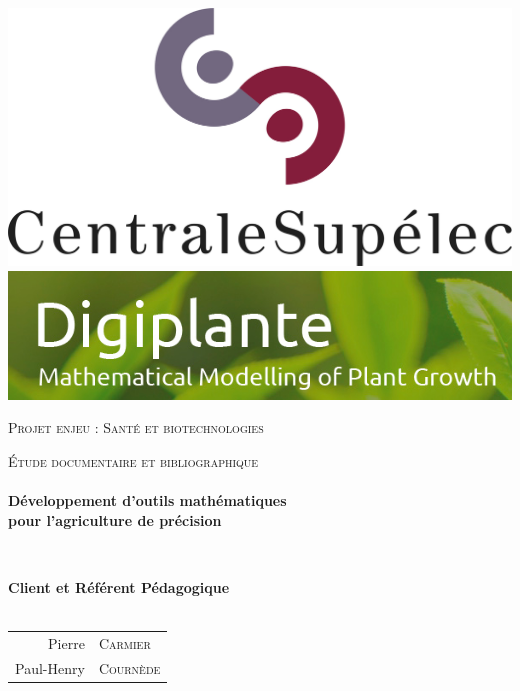 \begin{titlepage}
\begin{center}

\includegraphics[scale=0.5]{./img/logo_centralesup.jpg} \hfill
\includegraphics[scale=0.3]{./img/logo_digiplante.png}

\vfill 

\textsc{\Large Projet enjeu : Santé et biotechnologies}\\[0.5cm]

\vfill

\textsc{\Large \'Etude documentaire et bibliographique}\\[1.5cm] 

\HRule \\[0.4cm]
{ \LARGE \bfseries Développement d'outils mathématiques \\ 
   pour l'agriculture de précision \\[0.4cm] }

\HRule \\[1.5cm]

\vfill

{\large
\begin{center}
  \textbf{Client et Référent Pédagogique} \\~\\
\begin{tabular}{rl}
   \quad Pierre &\textsc{Carmier} \\
    \quad Paul-Henry &\textsc{Courn\`ede} \\
  

\end{tabular}
\end{center}}
\end{center}
\end{titlepage}
